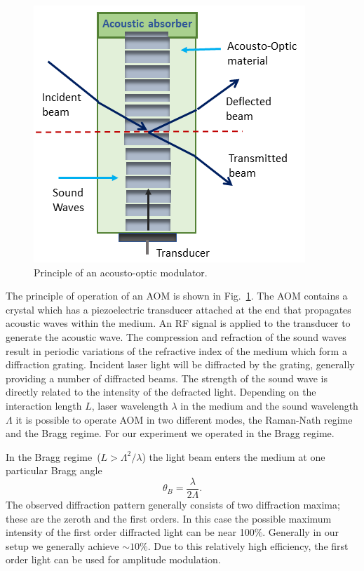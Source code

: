 \begin{figure}%
\centering
\includegraphics[width=0.7\linewidth]{figures/AOM}
\caption{Principle of an acousto-optic modulator.\label{fig:aom}}
\end{figure}

The principle of operation of an AOM is shown in Fig.~\ref{fig:aom}.
The AOM contains a crystal which has a piezoelectric transducer
attached at the end that propagates acoustic waves within the medium.
An RF signal is applied to the transducer to generate the acoustic
wave. The compression and refraction of the sound waves result in
periodic variations of the refractive index of the medium which form a
diffraction grating.  Incident laser light will be diffracted by the
grating, generally providing a number of diffracted beams. The
strength of the sound wave is directly related to the intensity of the
defracted light. Depending on the interaction length $L$, laser
wavelength $\lambda$ in the medium and the sound wavelength $\Lambda$
it is possible to operate AOM in two different modes, the Raman-Nath
regime and the Bragg regime. For our experiment we operated in the
Bragg regime.

In the Bragg regime~($L>\Lambda^2/\lambda$) the light beam enters
the medium at one particular Bragg angle
\begin{equation}
\theta_B=\frac{\lambda}{2\Lambda}.
\end{equation}                                 
The observed diffraction pattern generally consists of two diffraction
maxima; these are the zeroth and the first orders. In this case the
possible maximum intensity of the first order diffracted light can be
near 100\%.  Generally in our setup we generally achieve $\sim 10$\%.
Due to this relatively high efficiency, the first order light can be
used for amplitude modulation.

